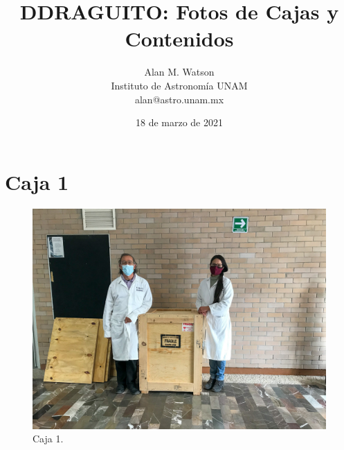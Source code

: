 \documentclass{article}
\begin{document}
\title{\bfseries DDRAGUITO: Fotos de Cajas y Contenidos}
\date{18 de marzo de 2021}
\author{Alan M. Watson\\Instituto de Astronomía UNAM\\alan@astro.unam.mx}

\maketitle

\newpage


\pagestyle{plain}

\clearpage
\section{Caja 1}

\begin{figure}[bp]
\begin{center}
\includegraphics[width=0.60\linewidth]{figures/20201210T144505.jpg}
\end{center}
\caption{Caja 1.}
\label{figure:box-one}
\end{figure}
\end{document}
